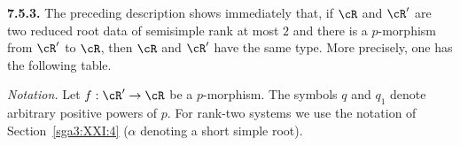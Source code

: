 \medskip
\noindent\textbf{7.5.3.}\label{sga3:XXI:7.5.3}
The preceding description shows immediately that, if \(\cR\) and
\(\cR'\) are two reduced root data of semisimple rank at most \(2\)
and there is a \(p\)-morphism from \(\cR'\) to \(\cR\), then
\(\cR\) and \(\cR'\) have the same type.  More precisely, one has
the following table.

\medskip
\noindent\emph{Notation.}
Let \(f:\cR'\to\cR\) be a \(p\)-morphism.  The symbols \(q\) and
\(q_1\) denote arbitrary positive powers of \(p\).  For rank-two
systems we use the notation of Section~\ref{sga3:XXI:4}
(\(\alpha\) denoting a short simple root).

\begin{center}
\begingroup
\renewcommand{\arraystretch}{1.35}
\end{center}
